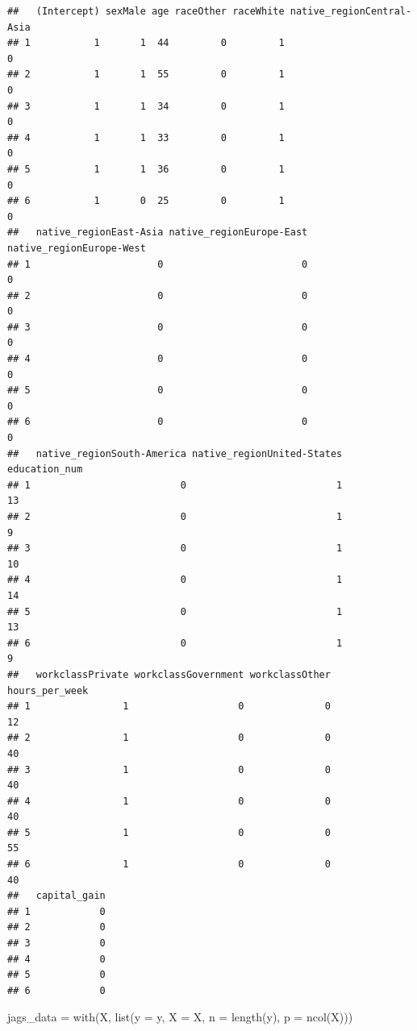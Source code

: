 \documentclass[
]{article}
\newenvironment{Shaded}{\begin{snugshade}}{\end{snugshade}}
\newcommand{\AttributeTok}[1]{\textcolor[rgb]{0.77,0.63,0.00}{#1}}
\newcommand{\FunctionTok}[1]{\textcolor[rgb]{0.00,0.00,0.00}{#1}}
\newcommand{\NormalTok}[1]{#1}
\newcommand{\OtherTok}[1]{\textcolor[rgb]{0.56,0.35,0.01}{#1}}
\begin{document}
\begin{verbatim}
##   (Intercept) sexMale age raceOther raceWhite native_regionCentral-Asia
## 1           1       1  44         0         1                         0
## 2           1       1  55         0         1                         0
## 3           1       1  34         0         1                         0
## 4           1       1  33         0         1                         0
## 5           1       1  36         0         1                         0
## 6           1       0  25         0         1                         0
##   native_regionEast-Asia native_regionEurope-East native_regionEurope-West
## 1                      0                        0                        0
## 2                      0                        0                        0
## 3                      0                        0                        0
## 4                      0                        0                        0
## 5                      0                        0                        0
## 6                      0                        0                        0
##   native_regionSouth-America native_regionUnited-States education_num
## 1                          0                          1            13
## 2                          0                          1             9
## 3                          0                          1            10
## 4                          0                          1            14
## 5                          0                          1            13
## 6                          0                          1             9
##   workclassPrivate workclassGovernment workclassOther hours_per_week
## 1                1                   0              0             12
## 2                1                   0              0             40
## 3                1                   0              0             40
## 4                1                   0              0             40
## 5                1                   0              0             55
## 6                1                   0              0             40
##   capital_gain
## 1            0
## 2            0
## 3            0
## 4            0
## 5            0
## 6            0
\end{verbatim}

\begin{Shaded}
\begin{Highlighting}[]
\NormalTok{jags\_data }\OtherTok{=} \FunctionTok{with}\NormalTok{(X, }\FunctionTok{list}\NormalTok{(}\AttributeTok{y =}\NormalTok{ y, }\AttributeTok{X =}\NormalTok{ X, }\AttributeTok{n =} \FunctionTok{length}\NormalTok{(y), }\AttributeTok{p =} \FunctionTok{ncol}\NormalTok{(X)))}
\end{Highlighting}
\end{Shaded}
\end{document}
